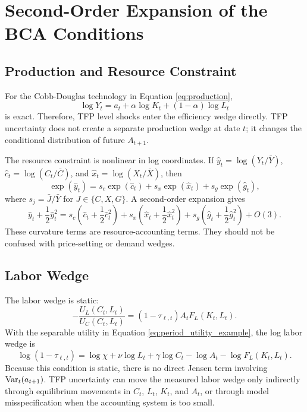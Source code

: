 \section{Second-Order Expansion of the BCA Conditions}

\subsection{Production and Resource Constraint}

For the Cobb-Douglas technology in Equation \eqref{eq:production},
\begin{equation}
    \log Y_t
    =
    a_t+\alpha\log K_t+(1-\alpha)\log L_t
    \label{eq:log_production_exact}
\end{equation}
is exact. Therefore, TFP level shocks enter the efficiency wedge directly. TFP
uncertainty does not create a separate production wedge at date \(t\); it changes
the conditional distribution of future \(A_{t+1}\).

The resource constraint is nonlinear in log coordinates. If
\(\hat{y}_t=\log(Y_t/\bar{Y})\), \(\hat{c}_t=\log(C_t/\bar{C})\), and
\(\hat{x}_t=\log(X_t/\bar{X})\), then
\begin{equation}
    \exp(\hat{y}_t)
    =
    s_c\exp(\hat{c}_t)
    +
    s_x\exp(\hat{x}_t)
    +
    s_g\exp(\hat{g}_t),
    \label{eq:exact_resource_log_coords}
\end{equation}
where \(s_j=\bar{J}/\bar{Y}\) for \(J\in\{C,X,G\}\). A second-order expansion
gives
\begin{equation}
    \hat{y}_t+\frac{1}{2}\hat{y}_t^2
    =
    s_c\left(\hat{c}_t+\frac{1}{2}\hat{c}_t^2\right)
    +
    s_x\left(\hat{x}_t+\frac{1}{2}\hat{x}_t^2\right)
    +
    s_g\left(\hat{g}_t+\frac{1}{2}\hat{g}_t^2\right)
    +
    O(3).
    \label{eq:second_order_resource}
\end{equation}
These curvature terms are resource-accounting terms. They should not be
confused with price-setting or demand wedges.

\subsection{Labor Wedge}

The labor wedge is static:
\[
    -\frac{U_L(C_t,L_t)}{U_C(C_t,L_t)}
    =
    (1-\tau_{\ell,t})A_tF_L(K_t,L_t).
\]
With the separable utility in Equation \eqref{eq:period_utility_example}, the
log labor wedge is
\begin{equation}
    \log(1-\tau_{\ell,t})
    =
    \log\chi+\nu\log L_t+\gamma\log C_t
    -
    \log A_t
    -
    \log F_L(K_t,L_t).
    \label{eq:log_labor_wedge}
\end{equation}
Because this condition is static, there is no direct Jensen term involving
\(\operatorname{Var}_t(a_{t+1})\). TFP uncertainty can move the measured labor wedge only
indirectly through equilibrium movements in \(C_t\), \(L_t\), \(K_t\), and
\(A_t\), or through model misspecification when the accounting system is too
small.

